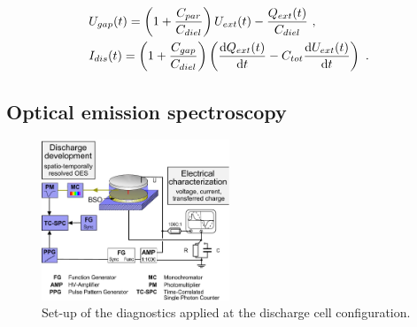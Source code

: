 \documentclass[a4paper,10pt]{article}
\newcommand{\diff}{\textnormal{d}}
\begin{document}
				\begin{align*}
					 &U_{gap}(t)=\left(1+\frac{C_{par}}{C_{diel}}\right)U_{ext}(t)-\frac{Q_{ext}(t)}{C_{diel}} \,\, , \\
					 &I_{dis}(t)=\left(1+\frac{C_{gap}}{C_{diel}}\right)\left(\frac{\diff Q_{ext}(t)}{\diff t}-C_{tot}\frac{\diff U_{ext}(t)}{\diff t}\right) \,\, .
				\end{align*}	

		\subsection{Optical emission spectroscopy}
		
				\begin{figure}
					\centering
					\includegraphics[width=0.5\textwidth]{figures/setup/diagnostic_setup}
					\caption{Set-up of the diagnostics applied at the discharge cell configuration.}
					\label{img:diag}
				\end{figure}
		
\end{document}
